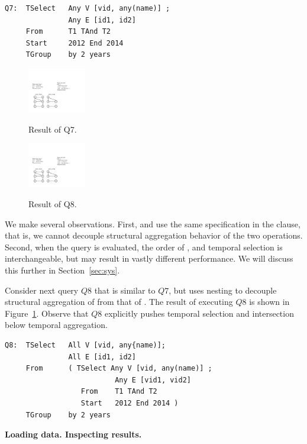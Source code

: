 \begin{verbatim}
Q7:  TSelect   Any V [vid, any(name)] ;
               Any E [id1, id2]
     From      T1 TAnd T2
     Start     2012 End 2014
     TGroup    by 2 years
\end{verbatim}

\begin{figure}
\centering
\begin{minipage}{1.6in}
  \centering
  \includegraphics[width=1in]{figs/q7.pdf}
  \caption{Result of Q7.}{}
  \label{fig:q7}
\end{minipage}%
\begin{minipage}{1.6in}
  \centering
  \includegraphics[width=1in]{figs/q8.pdf}
  \caption{Result of Q8.}{}
  \label{fig:q8}
\end{minipage}
\end{figure}

We make several observations.  First,  and 
use the same specification in the  clause, that is, we
cannot decouple structural aggregation behavior of the two
operations. Second, when the query is evaluated, the order of
,  and temporal selection is
interchangeable, but may result in vastly different performance.  We
will discuss this further in Section~\ref{sec:sys}.


Consider next query $Q8$ that is similar to $Q7$, but uses nesting to
decouple structural aggregation of  from that of
. The result of executing $Q8$ is shown in
Figure~\ref{fig:q8}.  Observe that $Q8$ explicitly pushes temporal
selection and intersection below temporal aggregation.

\begin{verbatim}
Q8:  TSelect   All V [vid, any{name)];
               All E [id1, id2]
     From      ( TSelect Any V [vid, any(name)] ; 
                          Any E [vid1, vid2]
                  From    T1 TAnd T2
                  Start   2012 End 2014 )
     TGroup    by 2 years
\end{verbatim}

{\bf Loading data.  Inspecting results.}

